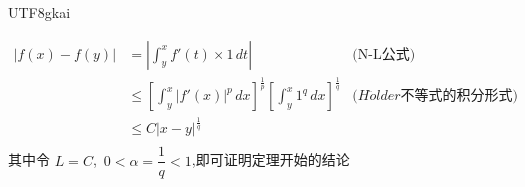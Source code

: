 \documentclass{article}
\newenvironment{cproof}{%
\heiti{证明}\kaishu
}{%
}
\newcommand{\bracket}[1]{\left[#1\right]}
\newcommand{\abs}[1]{\left|#1\right|}
\begin{document}
\begin{CJK}{UTF8}{gkai}
\begin{cproof}

\[
\begin{aligned}
  \abs{f(x) - f(y)} &= \abs{\int_{y}^{x} f'(t) \times 1 \,dt}&\text{(N-L公式)}\\
  &\leq \bracket{\int_{y}^{x} |f'(x)|^p \, dx}^{\frac{1}{p}} \bracket{\int_{y}^{x} 1^q \, dx}^{\frac{1}{q}}&\text{($H\ddot{o}lder$不等式的积分形式)}\\
  &\leq C \abs{x - y}^{\frac{1}{q}} \\
\end{aligned}  
\]
其中令 $L = C$,~$0 < \alpha = \dfrac{1}{q} < 1$,即可证明定理开始的结论
\end{cproof}

\end{CJK}
\end{document}
